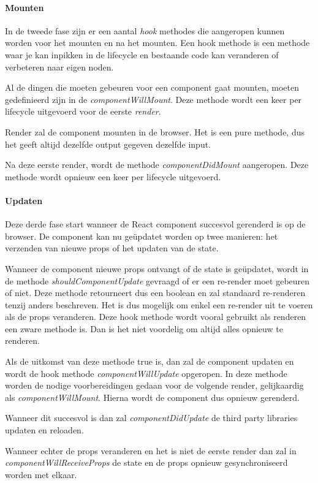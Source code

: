 \paragraph{Mounten}
In de tweede fase zijn er een aantal \textit{hook} methodes die aangeropen kunnen worden voor het mounten en na het mounten. Een hook methode is een methode waar je kan inpikken in de lifecycle en bestaande code kan veranderen of verbeteren naar eigen noden. 

Al de dingen die moeten gebeuren voor een component gaat mounten, moeten gedefinieerd zijn in de \textit{componentWillMount}. Deze methode wordt een keer per lifecycle uitgevoerd voor de eerste \textit{render}. 

Render zal de component mounten in de browser. Het is een pure methode, dus het geeft altijd dezelfde output gegeven dezelfde input. 

Na deze eerste render, wordt de methode \textit{componentDidMount} aangeropen. Deze methode wordt opnieuw een keer per lifecycle uitgevoerd. 

\paragraph{Updaten}
Deze derde fase start wanneer de React component succesvol gerenderd is op de browser. De component kan nu geüpdatet worden op twee manieren: het verzenden van nieuwe props of het updaten van de state. 

Wanneer de component nieuwe props ontvangt of de state is geüpdatet, wordt in de methode \textit{shouldComponentUpdate} gevraagd of er een re-render moet gebeuren of niet. Deze methode retourneert dus een boolean en zal standaard re-renderen tenzij anders beschreven. Het is dus mogelijk om enkel een re-render uit te voeren als de props veranderen. Deze hook methode wordt vooral gebruikt als renderen een zware methode is. Dan is het niet voordelig om altijd alles opnieuw te renderen.

Als de uitkomst van deze methode true is, dan zal de component updaten en wordt de hook methode \textit{componentWillUpdate} opgeropen. In deze methode worden de nodige voorbereidingen gedaan voor de volgende render, gelijkaardig als \textit{componentWillMount}. Hierna wordt de component dus opnieuw gerenderd. 

Wanneer dit succesvol is dan zal \textit{componentDidUpdate} de third party libraries updaten en reloaden. 

Wanneer echter de props veranderen en het is niet de eerste render dan zal in \textit{componentWillReceiveProps} de state en de props opnieuw gesynchroniseerd worden met elkaar. 

